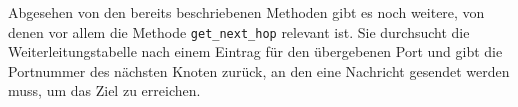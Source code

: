 Abgesehen von den bereits beschriebenen Methoden gibt es noch weitere, von denen vor allem die Methode \verb|get_next_hop| relevant ist. Sie durchsucht die Weiterleitungstabelle nach einem Eintrag für den übergebenen Port und gibt die Portnummer des nächsten Knoten zurück, an den eine Nachricht gesendet werden muss, um das Ziel zu erreichen.